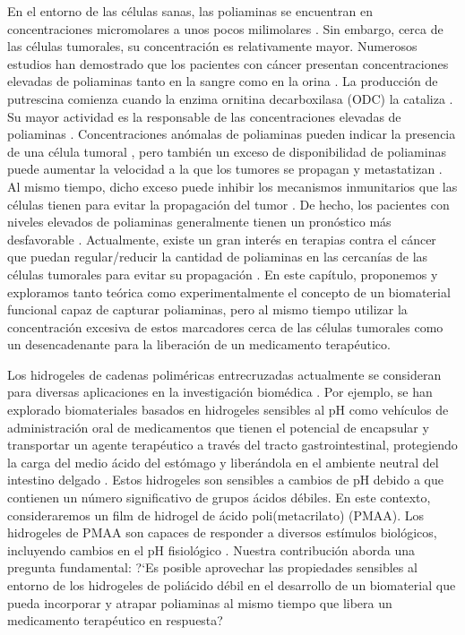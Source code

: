 En el entorno de las c\'elulas sanas, las poliaminas se encuentran en concentraciones micromolares a unos pocos milimolares \cite{porter1983, Russell}.
Sin embargo, cerca de las c\'elulas tumorales, su concentraci\'on es relativamente mayor.
Numerosos estudios han demostrado que los pacientes con c\'ancer presentan concentraciones elevadas de poliaminas tanto en la sangre como en la orina \cite{russell1971}. La producci\'on de putrescina comienza cuando la enzima ornitina decarboxilasa (ODC) la cataliza \cite{Soda2011,casero2009,pegg2010}. Su mayor actividad es la responsable de las concentraciones elevadas de poliaminas \cite{Soda2011,agostinelli2010polyamines,nowotarski2013}.
Concentraciones an\'omalas de poliaminas pueden indicar la presencia de una c\'elula tumoral \cite{park2013,gerner2004}, pero tambi\'en un exceso de disponibilidad de poliaminas puede aumentar la velocidad a la que los tumores se propagan y metastatizan \cite{Soda2011}.
Al mismo tiempo, dicho exceso puede inhibir los mecanismos inmunitarios que las c\'elulas tienen para evitar la propagaci\'on del tumor \cite{Soda2011,jasnis1994polyamines}.
De hecho, los pacientes con niveles elevados de poliaminas generalmente tienen un pron\'ostico m\'as desfavorable \cite{Soda2011,ikeda2011montmorillonite}.
Actualmente, existe un gran inter\'es en terapias contra el c\'ancer que puedan regular/reducir la cantidad de poliaminas en las cercan\'ias de las c\'elulas tumorales para evitar su propagaci\'on \cite{Soda2011,aziz1996potential,chen2006combination, bachrach2004polyamines}.
En este cap\'itulo, proponemos y exploramos tanto te\'orica como experimentalmente el concepto de un biomaterial funcional capaz de capturar poliaminas, pero al mismo tiempo utilizar la concentraci\'on excesiva de estos marcadores cerca de las c\'elulas tumorales como un desencadenante para la liberaci\'on de un medicamento terap\'eutico.

Los hidrogeles de cadenas polim\'ericas entrecruzadas actualmente se consideran para diversas aplicaciones en la investigaci\'on biom\'edica \cite{wang2019}.
Por ejemplo, se han explorado biomateriales basados en hidrogeles sensibles al pH como veh\'iculos de administraci\'on oral de medicamentos que tienen el potencial de encapsular y transportar un agente terap\'eutico a trav\'es del tracto gastrointestinal, protegiendo la carga del medio \'acido del est\'omago y liber\'andola en el ambiente neutral del intestino delgado  \cite{lowman1999,zhao2019,qindeel2019,li2019}.
Estos hidrogeles son sensibles a cambios de pH debido a que contienen un n\'umero significativo de grupos \'acidos d\'ebiles.
En este contexto, consideraremos un film de hidrogel de \'acido poli(metacrilato) (PMAA).
Los hidrogeles de PMAA son capaces de responder a diversos est\'imulos biol\'ogicos, incluyendo cambios en el pH fisiol\'ogico \cite{kanamala2016mechanisms}.
Nuestra contribuci\'on aborda una pregunta fundamental: ?`Es posible aprovechar las propiedades sensibles al entorno de los hidrogeles de poli\'acido d\'ebil en el desarrollo de un biomaterial que pueda incorporar y atrapar poliaminas al mismo tiempo que libera un medicamento terap\'eutico en respuesta?

